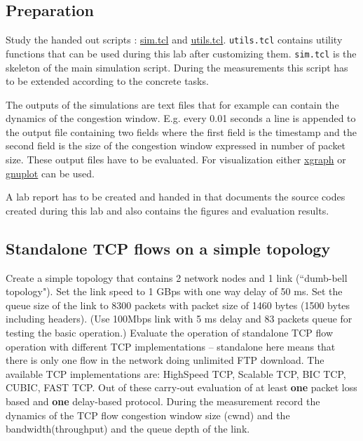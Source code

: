 \documentclass[a4paper]{article}
\begin{document}
\subsection{Preparation}

Study the handed out scripts :
\href{https://qosip.tmit.bme.hu/foswiki/pub/Meres/NagysebesseguTCPSzimulaciokFeladatok/sim.tcl}{sim.tcl}
and \href{https://qosip.tmit.bme.hu/foswiki/pub/Meres/NagysebesseguTCPSzimulaciokFeladatok/utils.tcl}{utils.tcl}.
\verb!utils.tcl! contains utility functions that can be used during this lab after customizing them.
\verb!sim.tcl! is the skeleton of the main simulation script. During the measurements this script
has to be extended according to the concrete tasks.

The outputs of the simulations are text files that for example can contain the dynamics of
the congestion window. E.g. every 0.01 seconds a line is appended to the output file containing
two fields where the first field is the timestamp and the second field is the size of the congestion
window expressed in number of packet size. These output files have to be evaluated. For visualization either
\href{http://www.xgraph.org/}{xgraph}
or \href{http://www.gnuplot.info/}{gnuplot} can be used.

A lab report has to be created and handed in that documents the source codes created during this lab and also contains the
figures and evaluation results.

\subsection{Standalone TCP flows on a simple topology}

Create a simple topology that contains 2 network nodes and 1 link (``dumb-bell topology").
Set the link speed to 1 GBps with one way delay of 50 ms. Set the queue size of the link to 8300 packets with packet
size of 1460 bytes (1500 bytes including headers).
(Use 100Mbps link with 5 ms delay and  83 packets queue for testing the basic operation.)
Evaluate the operation of standalone TCP flow operation with different TCP implementations -- standalone here means
that there is only one flow in the network
doing unlimited FTP download.
The available TCP implementations are: HighSpeed TCP, Scalable TCP, BIC TCP, CUBIC, FAST TCP. Out of these carry-out
evaluation of at least \textbf{one} packet loss based and \textbf{one} delay-based protocol.
During the measurement record the dynamics of the TCP flow congestion window size (cwnd) and the bandwidth(throughput)
and
the queue depth of the link.
\end{document}
